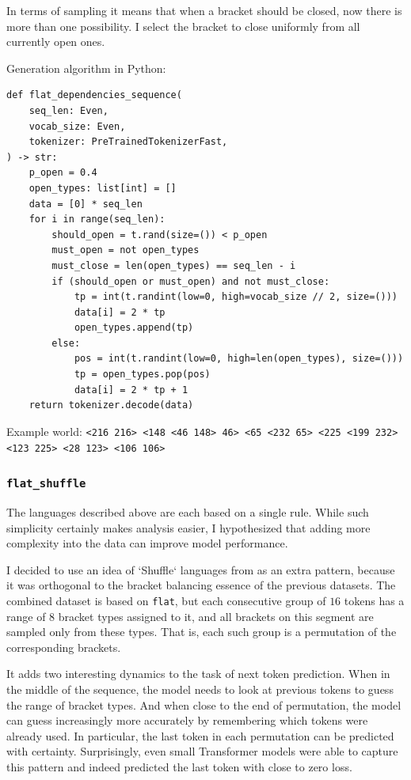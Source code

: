 \documentclass[a4paper, 11pt, oneside]{article}
\begin{document}
	In terms of sampling it means that when a bracket should be closed, now there is
	more than one possibility. I select the bracket to close uniformly from all
	currently open ones.

	Generation algorithm in Python: \begin{verbatim}
def flat_dependencies_sequence(
    seq_len: Even,
    vocab_size: Even,
    tokenizer: PreTrainedTokenizerFast,
) -> str:
    p_open = 0.4
    open_types: list[int] = []
    data = [0] * seq_len
    for i in range(seq_len):
        should_open = t.rand(size=()) < p_open
        must_open = not open_types
        must_close = len(open_types) == seq_len - i
        if (should_open or must_open) and not must_close:
            tp = int(t.randint(low=0, high=vocab_size // 2, size=()))
            data[i] = 2 * tp
            open_types.append(tp)
        else:
            pos = int(t.randint(low=0, high=len(open_types), size=()))
            tp = open_types.pop(pos)
            data[i] = 2 * tp + 1
    return tokenizer.decode(data)
\end{verbatim}

	Example world: \verb|<216 216> <148 <46 148> 46> <65 <232 65> <225 <199 232> <123 225> <28 123> <106 106>|

	\subsubsection{\texttt{flat\_shuffle}}
	The languages described above are each based on a single rule. While such simplicity
	certainly makes analysis easier, I hypothesized that adding more complexity
	into the data can improve model performance.

	I decided to use an idea of `Shuffle` languages from
	\cite{chiang2022transferability} as an extra pattern, because it was orthogonal
	to the bracket balancing essence of the previous datasets. The combined
	dataset is based on \texttt{flat}, but each consecutive group of $16$ tokens
	has a range of $8$ bracket types assigned to it, and all brackets on this segment
	are sampled only from these types. That is, each such group is a permutation of
	the corresponding brackets.

	It adds two interesting dynamics to the task of next token prediction. When in
	the middle of the sequence, the model needs to look at previous tokens to guess
	the range of bracket types. And when close to the end of permutation, the model
	can guess increasingly more accurately by remembering which tokens were already
	used. In particular, the last token in each permutation can be predicted with certainty.
	Surprisingly, even small Transformer models were able to capture this pattern and
	indeed predicted the last token with close to zero loss.
\end{document}
